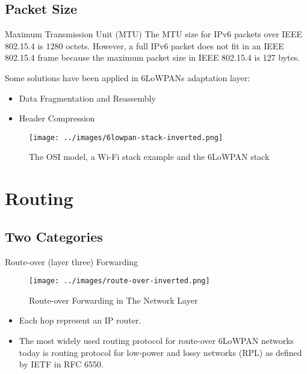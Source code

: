 \documentclass[10pt]{beamer}
\begin{document}
\subsection{Packet Size}
\begin{frame}{Maximum Transmission Unit (MTU)}
    The MTU size for IPv6 packets over IEEE 802.15.4 is 1280 octets. However, a full IPv6 packet does not fit in an IEEE 802.15.4 frame\cite{rfc4919} because the maximum packet size in IEEE 802.15.4 is 127 bytes.

    \bigskip
    Some solutions have been applied in 6LoWPANs adaptation layer:
    \begin{itemize}
        \item Data Fragmentation and Reassembly
        \item Header Compression
    \end{itemize}
    \begin{figure}[htpb]
        \centering
        \texttt{[image: ../images/6lowpan-stack-inverted.png]}
        \caption{The OSI model, a Wi-Fi stack example and the 6LoWPAN stack\cite{olsson20146lowpan}}
    \end{figure}

\end{frame}

\section{Routing}
\subsection{Two Categories}
\begin{frame}{Route-over (layer three) Forwarding}
    \begin{figure}[htpb]
        \centering
        \texttt{[image: ../images/route-over-inverted.png]}
        \caption{Route-over Forwarding in The Network Layer\cite{olsson20146lowpan}}
    \end{figure}

    \begin{itemize}
        \item Each hop represent an IP router.\cite{olsson20146lowpan}
        \item The most widely used routing protocol for route-over 6LoWPAN networks today is routing protocol for low-power and lossy networks (RPL) as defined by IETF in RFC 6550.\cite{olsson20146lowpan}
    \end{itemize}
\end{frame}
\end{document}
